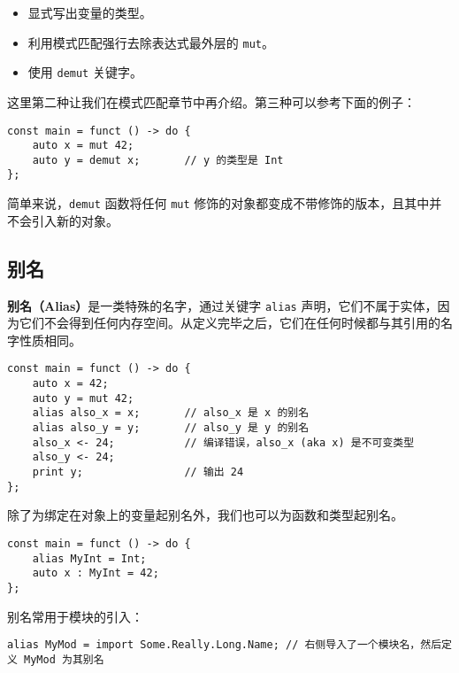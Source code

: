 \begin{itemize}
	\item 显式写出变量的类型。
	\item 利用模式匹配强行去除表达式最外层的 \lstinline!mut!。
	\item 使用 \lstinline!demut! 关键字。
\end{itemize}

这里第二种让我们在模式匹配章节中再介绍。第三种可以参考下面的例子：

\begin{minipage}[c]{0.95\textwidth}
\vspace{1.0em}
\begin{lstlisting}
const main = funct () -> do {
    auto x = mut 42;
    auto y = demut x;		// y 的类型是 Int
};
\end{lstlisting}
\end{minipage}

简单来说，\lstinline!demut! 函数将任何 \lstinline!mut! 修饰的对象都变成不带修饰的版本，且其中并不会引入新的对象。

\subsection{别名}

\textbf{别名（Alias）}是一类特殊的名字，通过关键字 \lstinline!alias! 声明，它们不属于实体，因为它们不会得到任何内存空间。从定义完毕之后，它们在任何时候都与其引用的名字性质相同。

\begin{minipage}[c]{0.95\textwidth}
\vspace{1.0em}
\begin{lstlisting}
const main = funct () -> do {
    auto x = 42;
    auto y = mut 42;
    alias also_x = x;       // also_x 是 x 的别名
    alias also_y = y;       // also_y 是 y 的别名
    also_x <- 24;           // 编译错误，also_x (aka x) 是不可变类型
    also_y <- 24;
    print y;                // 输出 24
};
\end{lstlisting}
\end{minipage}

除了为绑定在对象上的变量起别名外，我们也可以为函数和类型起别名。

\begin{lstlisting}
const main = funct () -> do {
    alias MyInt = Int;
    auto x : MyInt = 42;
};
\end{lstlisting}

别名常用于模块的引入：

\begin{lstlisting}
alias MyMod = import Some.Really.Long.Name;	// 右侧导入了一个模块名，然后定义 MyMod 为其别名
\end{lstlisting}

